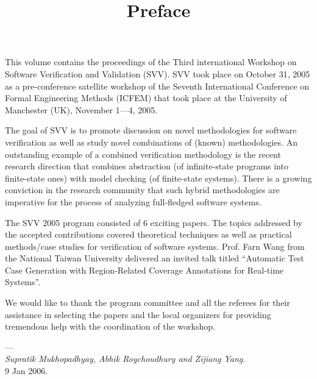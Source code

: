 \documentclass{entcs}
\begin{document}
\begin{frontmatter}
  \title{\bf Preface}
\end{frontmatter}

This volume contains the proceedings of the Third international Workshop
on Software Verification and Validation (SVV). SVV took place  on
October 31, 2005 as a pre-conference satellite workshop of the
Seventh International Conference on Formal Engineering Methods (ICFEM) that
took place at the University of Manchester (UK), November 1---4, 2005.

The goal of SVV is to promote discussion on novel methodologies for
software verification as well as study novel combinations of (known)
methodologies. An outstanding example of a combined verification
methodology is the recent research direction that combines abstraction
(of infinite-state programs into finite-state ones) with model checking
(of finite-state systems). There is a growing conviction in the research
community that such hybrid methodologies are imperative for the process
of analyzing full-fledged software systems. 

The SVV 2005 program consisted of 6 exciting papers.  The topics
addressed by the accepted contributions covered theoretical techniques
as well as practical methods/case studies for verification of software
systems. Prof. Farn Wang from the National Taiwan University
delivered an invited talk titled ``Automatic Test Case Generation with
Region-Related Coverage Annotations for Real-time Systems''.

We would like to thank the program committee and all the referees for
their assistance in selecting the papers and the local organizers for
providing tremendous help with the coordination of the workshop.

\vspace{15pt}
\noindent ---\\
{\em Supratik Mukhopadhyay, Abhik Roychoudhury and Zijiang Yang}.\\
9 Jan 2006.
\end{document}
